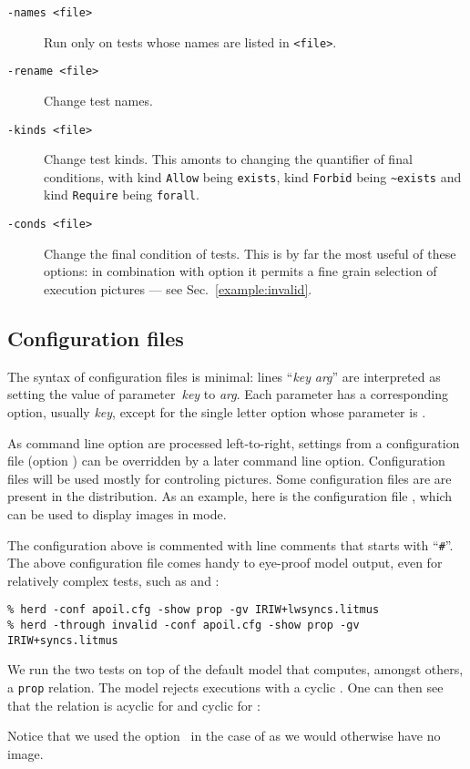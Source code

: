 \begin{description}
\item[{\tt -names <file>}] Run \herd{} only on tests whose names are
listed in \texttt{<file>}.
\item[{\tt -rename <file>}] Change test names.
\item[{\tt -kinds <file>}] Change test kinds.
This amonts to changing the quantifier of final conditions, with
kind \texttt{Allow} being \verb+exists+,
kind \texttt{Forbid} being \verb+~exists+
and kind \texttt{Require} being \verb+forall+.
\item[{\tt -conds <file>}] Change the final condition of tests.
This is by far the most useful of these options:
in combination with option  it permits a fine grain
selection of execution pictures --- see Sec.~\ref{example:invalid}.
\end{description}

\subsection{\label{herd:configfile}{Configuration files}}
The syntax of configuration files is minimal:
lines ``\textit{key} \textit{arg}'' are interpreted
as setting the value of parameter~\textit{key} to \textit{arg}.
Each parameter has a corresponding option,
usually \opt{-}\textit{key}, except for the single letter
option  whose parameter is .

As command line option are processed left-to-right,
settings from a configuration file (option )
can be overridden by a later command line option.
Configuration files will be used mostly for controling pictures.
Some configuration files are
are present in the distribution.
As an example, here is the configuration file ,
which can be used to display images in  mode.

The configuration above is commented with line comments that starts
with ``\verb+#+''.
The above configuration file comes handy to eye-proof model output,
even for relatively complex tests, such as 
and :
\begin{verbatim}
% herd -conf apoil.cfg -show prop -gv IRIW+lwsyncs.litmus
% herd -through invalid -conf apoil.cfg -show prop -gv IRIW+syncs.litmus
\end{verbatim}
We run the two tests on top of the default model that computes,
amongst others, a \texttt{prop} relation. The model rejects executions
with a cyclic .
One can then see that the relation  is acyclic
for  and cyclic for :
\begin{center}\quad\quad{}\end{center}
Notice that we used the option~ in the case
of  as we would otherwise have no image.


